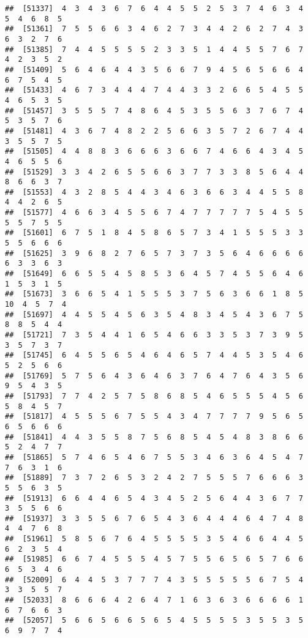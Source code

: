 \documentclass[
]{book}
\begin{document}
\begin{verbatim}
##  [51337]  4  3  4  3  6  7  6  4  4  5  5  2  5  3  7  4  6  3  4  5  4  6  8  5
##  [51361]  7  5  5  6  6  3  4  6  2  7  3  4  4  2  6  2  7  4  3  6  3  2  7  6
##  [51385]  7  4  4  5  5  5  5  2  3  3  5  1  4  4  5  5  7  6  7  4  2  3  5  2
##  [51409]  5  6  4  6  4  4  3  5  6  6  7  9  4  5  6  5  6  6  4  6  7  5  4  5
##  [51433]  4  6  7  3  4  4  4  7  4  4  3  3  2  6  6  5  4  5  5  4  6  5  3  5
##  [51457]  3  5  5  5  7  4  8  6  4  5  3  5  5  6  3  7  6  7  4  5  3  5  7  6
##  [51481]  4  3  6  7  4  8  2  2  5  6  6  3  5  7  2  6  7  4  4  3  5  5  7  5
##  [51505]  4  4  8  8  3  6  6  6  3  6  6  7  4  6  6  4  3  4  5  4  6  5  5  6
##  [51529]  3  3  4  2  6  5  5  6  6  3  7  7  3  3  8  5  6  4  4  8  6  6  3  7
##  [51553]  4  3  2  8  5  4  4  3  4  6  3  6  6  3  4  4  5  5  8  4  4  2  6  5
##  [51577]  4  6  6  3  4  5  5  6  7  4  7  7  7  7  7  5  4  5  5  5  5  7  5  5
##  [51601]  6  7  5  1  8  4  5  8  6  5  7  3  4  1  5  5  5  3  3  5  5  6  6  6
##  [51625]  3  9  6  8  2  7  6  5  7  3  7  3  5  6  4  6  6  6  6  6  3  3  6  3
##  [51649]  6  6  5  5  4  5  8  5  3  6  4  5  7  4  5  5  6  4  6  1  5  3  1  5
##  [51673]  3  6  6  5  4  1  5  5  5  3  7  5  6  3  6  6  1  8  5 10  4  5  7  4
##  [51697]  4  4  5  5  4  5  6  3  5  4  8  3  4  5  4  3  6  7  5  8  8  5  4  4
##  [51721]  7  3  5  4  4  1  6  5  4  6  6  3  3  5  3  7  3  9  5  3  5  7  3  7
##  [51745]  6  4  5  5  6  5  4  6  4  6  5  7  4  4  5  3  5  4  6  5  2  5  6  6
##  [51769]  5  7  5  6  4  3  6  4  6  3  7  6  4  7  6  4  3  5  6  9  5  4  3  5
##  [51793]  7  7  4  2  5  7  5  8  6  8  5  4  6  5  5  5  4  5  6  5  8  4  5  7
##  [51817]  4  5  5  5  6  7  5  5  4  3  4  7  7  7  7  9  5  6  5  6  5  6  6  6
##  [51841]  4  4  3  5  5  8  7  5  6  8  5  4  5  4  8  3  8  6  6  5  2  4  7  7
##  [51865]  5  7  4  6  5  4  6  7  5  5  3  4  6  3  6  4  5  4  7  7  6  3  1  6
##  [51889]  7  3  7  2  6  5  3  2  4  2  7  5  5  5  7  6  6  6  3  5  5  6  3  5
##  [51913]  6  6  4  4  6  5  4  3  4  5  2  5  6  4  4  3  6  7  7  3  5  5  6  6
##  [51937]  3  3  5  5  6  7  6  5  4  3  6  4  4  4  6  4  7  4  8  4  4  7  6  8
##  [51961]  5  8  5  6  7  6  4  5  5  5  5  3  5  4  6  6  4  4  5  6  2  3  5  4
##  [51985]  6  6  7  4  5  5  5  4  5  7  5  5  6  5  6  5  7  6  6  6  5  3  4  6
##  [52009]  6  4  4  5  3  7  7  7  4  3  5  5  5  5  5  6  7  5  4  3  3  5  5  7
##  [52033]  8  6  6  6  4  2  6  4  7  1  6  3  6  3  6  6  6  6  1  6  7  6  6  3
##  [52057]  5  6  6  5  6  6  5  6  5  4  5  5  5  5  3  5  5  3  5  6  9  7  7  4

\end{verbatim}
\end{document}

